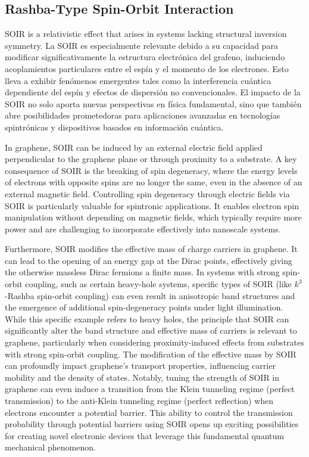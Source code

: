 \subsection{Rashba-Type Spin-Orbit Interaction}\label{subsec:rashba-type-spin-orbit-interaction}

SOIR is a relativistic effect that arises in systems lacking structural inversion symmetry\cite{AvishaiPhysRevB2021}.
La SOIR es especialmente relevante debido a su capacidad para modificar significativamente la estructura electrónica del grafeno, induciendo acoplamientos particulares entre el espín y el momento de los electrones.
Esto lleva a exhibir fenómenos emergentes tales como la interferencia cuántica dependiente del espín y efectos de dispersión no convencionales.
El impacto de la SOIR no solo aporta nuevas perspectivas en física fundamental, sino que también abre posibilidades prometedoras para aplicaciones avanzadas en tecnologías spintrónicas y dispositivos basados en información cuántica.

In graphene, SOIR can be induced by an external electric field applied perpendicular to the graphene plane or through proximity to a substrate\cite{ShcherbakovSciAdv2021}.
A key consequence of SOIR is the breaking of spin degeneracy, where the energy levels of electrons with opposite spins are no longer the same, even in the absence of an external magnetic field\cite{DelkhoshPhysE2015}.
Controlling spin degeneracy through electric fields via SOIR is particularly valuable for spintronic applications.
It enables electron spin manipulation without depending on magnetic fields, which typically require more power and are challenging to incorporate effectively into nanoscale systems.


Furthermore, SOIR modifies the effective mass of charge carriers in graphene\cite{WangPhysRevX2016}.
It can lead to the opening of an energy gap at the Dirac points, effectively giving the otherwise massless Dirac fermions a finite mass.
In systems with strong spin-orbit coupling, such as certain heavy-hole systems, specific types of SOIR (like $k^3$-Rashba spin-orbit coupling) can even result in anisotropic band structures and the emergence of additional spin-degeneracy points under light illumination.
While this specific example refers to heavy holes, the principle that SOIR can significantly alter the band structure and effective mass of carriers is relevant to graphene, particularly when considering proximity-induced effects from substrates with strong spin-orbit coupling\cite{GindikinPhysRevB2025}.
The modification of the effective mass by SOIR can profoundly impact graphene's transport properties, influencing carrier mobility and the density of states.
Notably, tuning the strength of SOIR in graphene can even induce a transition from the Klein tunneling regime (perfect transmission) to the anti-Klein tunneling regime (perfect reflection) when electrons encounter a potential barrier.
This ability to control the transmission probability through potential barriers using SOIR opens up exciting possibilities for creating novel electronic devices that leverage this fundamental quantum mechanical phenomenon\cite{YaoMater2024}.

